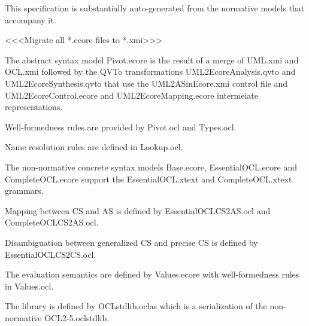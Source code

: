 \label{ocl:TheModels}

This specification is substantially auto-generated from the normative models that accompany it.

<<<Migrate all *.ecore files to *.xmi>>>


The abstract syntax model Pivot.ecore is the result of a merge of UML.xmi and OCL.xmi followed by the QVTo transformations UML2EcoreAnalysis.qvto and UML2EcoreSynthesis.qvto that use the UML2ASinEcore.xmi control file and UML2EcoreControl.ecore and UML2EcoreMapping.ecore intermeiate representations.

Well-formedness rules are provided by Pivot.ocl and Types.ocl.

Name resolution rules are defined in Lookup.ocl.


The non-normative concrete syntax models Base.ecore, EssentialOCL.ecore and CompleteOCL.ecore support the EssentialOCL.xtext and CompleteOCL.xtext grammars.

Mapping between CS and AS is defined by EssentialOCLCS2AS.ocl and CompleteOCLCS2AS.ocl.

Disambiguation between generalized CS and precise CS is defined by EssentialOCLCS2CS.ocl.


The evaluation semantics are defined by Values.ecore with well-formedness rules in Values.ocl.


The library is defined by OCLstdlib.oclas which is a serialization of the non-normative OCL2-5.oclstdlib.